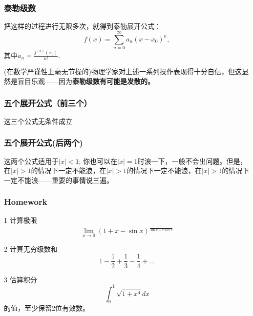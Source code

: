 \documentclass[CJK,13pt]{beamer}
\begin{document}
\begin{frame}
  \frametitle{泰勒级数}
  
  把这样的过程进行无限多次，就得到{\blue 泰勒展开公式：
  $$f(x) = \sum_{n=0}^\infty a_n(x-x_0)^n,$$
  其中$a_n = \frac{f^{(n)}(x_0)}{n!}$.}

  \skiplines

  (在数学严谨性上毫无节操的)物理学家对上述一系列操作表现得十分自信，但这显然是盲目乐观——因为{\bf 泰勒级数有可能是发散的。}
  
\end{frame}






\begin{frame}
  \frametitle{五个展开公式（前三个）}
  这三个公式无条件成立
\end{frame}


\begin{frame}
  \frametitle{五个展开公式(后两个)}
  这两个公式{\blue 适用于$|x|< 1$}; 你也可以在$|x|=1$时浪一下，一般不会出问题。但是，{\blue 在$|x|>1$的情况下一定不能浪，在$|x|>1$的情况下一定不能浪，在$|x|>1$的情况下一定不能浪}——重要的事情说三遍。
\end{frame}







\begin{frame}
  \frametitle{Homework}
  \bitem
\item[1]{计算极限 $$\lim_{x\rightarrow 0} (1+x-\sin x)^{\frac{1}{\sin x - x\cos x}} $$}
\item[2]{计算无穷级数和 $$1-\frac{1}{2}+\frac{1}{3}-\frac{1}{4}+\ldots $$}
\item[3]{估算积分  $$\int_0^1 \sqrt{1+x^4} dx $$ 的值，至少保留2位有效数。 }
  \eitem
\end{frame}

\ech
\end{document}
